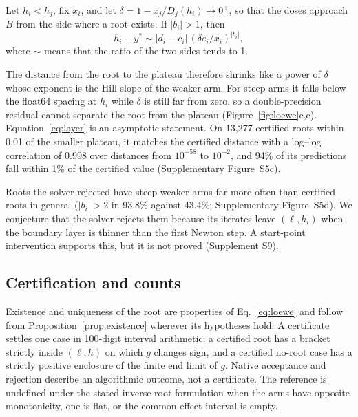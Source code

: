 \documentclass[11pt]{article}
\begin{document}
\begin{proposition}\label{prop:layer}
Let $h_i<h_j$, fix $x_i$, and let $\delta=1-x_j/D_j(h_i)\to0^+$, so that the doses approach $B$ from the side where a root exists. If $|b_i|>1$, then
\begin{equation}\label{eq:layer}
h_i-y^*\sim|d_i-c_i|\,(\delta e_i/x_i)^{|b_i|},
\end{equation}
where $\sim$ means that the ratio of the two sides tends to 1.
\end{proposition}

The distance from the root to the plateau therefore shrinks like a power of $\delta$ whose exponent is the Hill slope of the weaker arm. For steep arms it falls below the float64 spacing at $h_i$ while $\delta$ is still far from zero, so a double-precision residual cannot separate the root from the plateau (Figure~\ref{fig:loewe}c,e). Equation~\eqref{eq:layer} is an asymptotic statement. On 13,277 certified roots within 0.01 of the smaller plateau, it matches the certified distance with a log–log correlation of 0.998 over distances from $10^{-58}$ to $10^{-2}$, and 94\% of its predictions fall within 1\% of the certified value (Supplementary Figure~S5c).

Roots the solver rejected have steep weaker arms far more often than certified roots in general ($|b_i|>2$ in 93.8\% against 43.4\%; Supplementary Figure~S5d). We conjecture that the solver rejects them because its iterates leave $(\ell,h_i)$ when the boundary layer is thinner than the first Newton step. A start-point intervention supports this, but it is not proved (Supplement S9).

\subsection{Certification and counts}\label{sec:counts}
Existence and uniqueness of the root are properties of Eq.~\eqref{eq:loewe} and follow from Proposition~\ref{prop:existence} wherever its hypotheses hold. A certificate settles one case in 100-digit interval arithmetic: a certified root has a bracket strictly inside $(\ell,h)$ on which $g$ changes sign, and a certified no-root case has a strictly positive enclosure of the finite end limit of $g$. Native acceptance and rejection describe an algorithmic outcome, not a certificate. The reference is undefined under the stated inverse-root formulation when the arms have opposite monotonicity, one is flat, or the common effect interval is empty.
\end{document}

